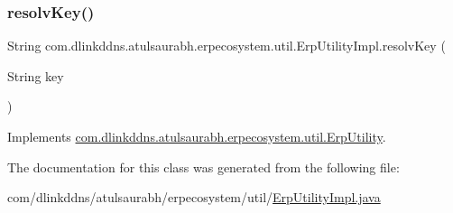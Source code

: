 \subsubsection{\texorpdfstring{resolv\+Key()}{resolvKey()}}
{\footnotesize\ttfamily String com.\+dlinkddns.\+atulsaurabh.\+erpecosystem.\+util.\+Erp\+Utility\+Impl.\+resolv\+Key (\begin{DoxyParamCaption}\item[{String}]{key }\end{DoxyParamCaption})}



Implements \mbox{\hyperlink{interfacecom_1_1dlinkddns_1_1atulsaurabh_1_1erpecosystem_1_1util_1_1_erp_utility_a177b7a6f2a1ab3a9e620ca914ddcd6d9}{com.\+dlinkddns.\+atulsaurabh.\+erpecosystem.\+util.\+Erp\+Utility}}.



The documentation for this class was generated from the following file\+:\begin{DoxyCompactItemize}
\item 
com/dlinkddns/atulsaurabh/erpecosystem/util/\mbox{\hyperlink{_erp_utility_impl_8java}{Erp\+Utility\+Impl.\+java}}\end{DoxyCompactItemize}
